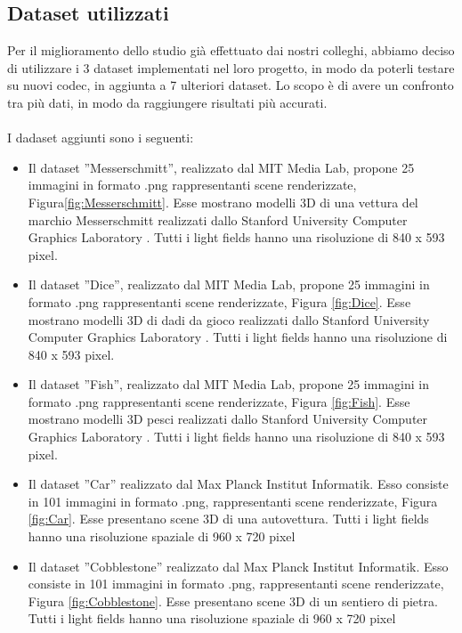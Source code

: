 \subsection{Dataset utilizzati}
Per il miglioramento dello studio già effettuato dai nostri colleghi, abbiamo deciso di utilizzare i 3 dataset implementati nel loro progetto, in modo da poterli testare su nuovi codec, in aggiunta a 7 ulteriori dataset. Lo scopo è di avere un confronto tra più dati, in modo da raggiungere risultati più accurati.
\\
\\
I dadaset aggiunti sono i seguenti:
\begin{itemize}
    \item Il dataset ”Messerschmitt”\cite{Messerschmitt}, realizzato dal MIT Media Lab, propone 25 immagini in formato .png rappresentanti scene renderizzate, Figura\ref{fig:Messerschmitt}. Esse mostrano modelli 3D di una vettura del marchio Messerschmitt  realizzati dallo Stanford University Computer Graphics Laboratory \cite{3Dscanrep}. Tutti i light fields hanno una risoluzione di 840 x 593 pixel.
    
    \item Il dataset ”Dice”\cite{Dice}, realizzato dal MIT Media Lab, propone 25 immagini in formato .png rappresentanti scene renderizzate, Figura \ref{fig:Dice}. Esse mostrano modelli 3D di dadi da gioco realizzati dallo Stanford University Computer Graphics Laboratory \cite{3Dscanrep}. Tutti i light fields hanno una risoluzione di 840 x 593 pixel.
    
    \item Il dataset ”Fish”\cite{Fish}, realizzato dal MIT Media Lab, propone 25 immagini in formato .png rappresentanti scene renderizzate, Figura \ref{fig:Fish}. Esse mostrano modelli 3D pesci realizzati dallo Stanford University Computer Graphics Laboratory \cite{3Dscanrep}. Tutti i light fields hanno una risoluzione di 840 x 593 pixel.

    \item  Il dataset ”Car”\cite{Car} realizzato dal Max Planck Institut Informatik. Esso consiste in 101 immagini in formato .png, rappresentanti scene renderizzate, Figura \ref{fig:Car}. Esse presentano scene 3D di una autovettura. Tutti i light fields hanno una risoluzione spaziale di 960 x 720 pixel

    \item  Il dataset ”Cobblestone”\cite{Cobblestone} realizzato dal Max Planck Institut Informatik. Esso consiste in 101 immagini in formato .png, rappresentanti scene renderizzate, Figura \ref{fig:Cobblestone}. Esse presentano scene 3D di un sentiero di pietra. Tutti i light fields hanno una risoluzione spaziale di 960 x 720 pixel


\end{itemize}
